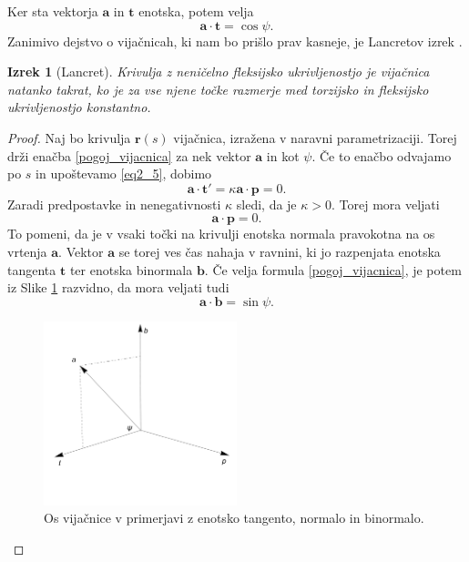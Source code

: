 \documentclass[12pt,a4paper,twoside]{article}
\theoremstyle{definition} %
\theoremstyle{plain} %
\newtheorem{izrek}[definicija]{Izrek}
\theoremstyle{primerstyle}
\numberwithin{equation}{section}  %
\newcommand{\tV}{\mathbf{t}}
\newcommand{\aV}{\mathbf{a}}
\newcommand{\bV}{\mathbf{b}}
\newcommand{\pV}{\mathbf{p}}
\newcommand{\rV}{\mathbf{r}}
\begin{document}
Ker sta vektorja $\aV$ in $\tV$ enotska, potem velja
\begin{equation}
	\label{pogoj_vijacnica}
	\aV \cdot \tV=\cos \psi.
\end{equation}
Zanimivo dejstvo o vijačnicah, ki nam bo prišlo prav kasneje, je Lancretov izrek \cite[str.\ 41]{kreyszig2019differential}.
\begin{izrek}[Lancret]
	\label{lancret}
	Krivulja z neničelno fleksijsko ukrivljenostjo je vijačnica natanko takrat, ko je za vse njene točke razmerje med torzijsko in fleksijsko ukrivljenostjo konstantno.
\end{izrek}
\begin{proof}
	Naj bo krivulja $\rV(s)$ vijačnica, izražena v naravni parametrizaciji. Torej drži enačba \eqref{pogoj_vijacnica} za nek vektor $\aV$ in kot $\psi.$ Če to enačbo odvajamo po $s$ in upoštevamo \eqref{eq2_5}, dobimo
	\begin{equation*}
		\aV \cdot \tV'=\kappa \aV \cdot \pV=0.
	\end{equation*}
	Zaradi predpostavke in nenegativnosti $\kappa$ sledi, da je $\kappa > 0.$ Torej mora veljati
	\begin{equation}
	\label{eq4_19}
	\aV \cdot \pV=0.
	\end{equation}
	To pomeni, da je v vsaki točki na krivulji enotska normala pravokotna na os vrtenja $\aV.$ Vektor $\aV$ se torej ves čas nahaja v ravnini, ki jo razpenjata enotska tangenta $\tV$ ter enotska binormala $\bV.$ Če velja formula \eqref{pogoj_vijacnica}, je potem iz Slike \ref{fig:lancret} razvidno, da mora veljati tudi
	\begin{equation*}
		\aV \cdot \bV=\sin \psi.
	\end{equation*}
	\begin{figure}[h!]
	  \centering
	  \includegraphics[width=0.5\textwidth]{images/lancret.pdf}
	  \caption[Os vijačnice v primerjavi z enotsko tangento, normalo in binormalo]{Os vijačnice v primerjavi z enotsko tangento, normalo in binormalo.}
	  \label{fig:lancret}
	\end{figure}
	

\end{proof}
\end{document}
